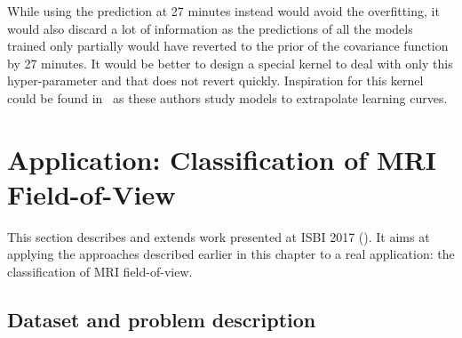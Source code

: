 While using the prediction at 27 minutes instead would avoid the overfitting, it would also discard a lot of information as the predictions of all the models trained only partially would have reverted to the prior of the covariance function by 27 minutes. It would be better to design a special kernel to deal with only this hyper-parameter and that does not revert quickly. Inspiration for this kernel could be found in~\textcite{domhan2015} as these authors study models to extrapolate learning curves.

\section{Application: Classification of MRI Field-of-View}
\label{sec:isbi}

This section describes and extends work presented at ISBI 2017 (\textcite{bertrand2017ISBI}). It aims at applying the approaches described earlier in this chapter to a real application: the classification of MRI field-of-view.

\subsection{Dataset and problem description}

